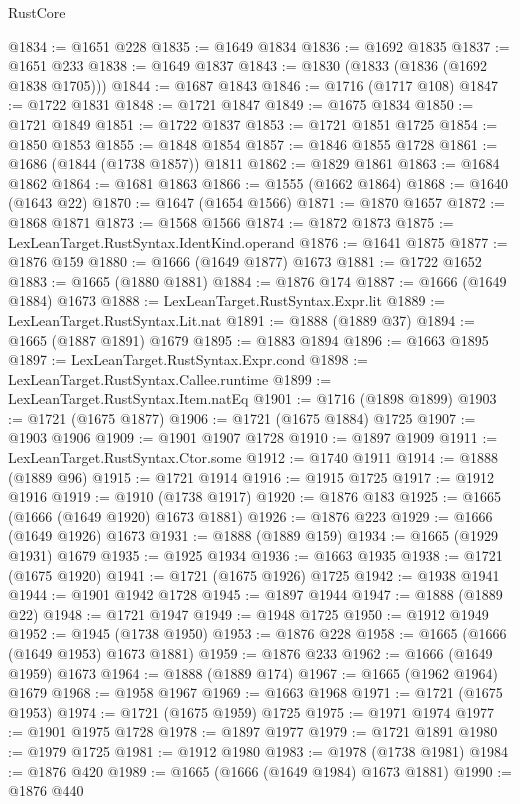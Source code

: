 \begin{lexlean}{RustCore}
\begin{coremodule}
@1834 := @1651 @228
@1835 := @1649 @1834
@1836 := @1692 @1835
@1837 := @1651 @233
@1838 := @1649 @1837
@1843 := @1830 (@1833 (@1836 (@1692 @1838 @1705)))
@1844 := @1687 @1843
@1846 := @1716 (@1717 @108)
@1847 := @1722 @1831
@1848 := @1721 @1847
@1849 := @1675 @1834
@1850 := @1721 @1849
@1851 := @1722 @1837
@1853 := @1721 @1851 @1725
@1854 := @1850 @1853
@1855 := @1848 @1854
@1857 := @1846 @1855 @1728
@1861 := @1686 (@1844 (@1738 @1857)) @1811
@1862 := @1829 @1861
@1863 := @1684 @1862
@1864 := @1681 @1863
@1866 := @1555 (@1662 @1864)
@1868 := @1640 (@1643 @22)
@1870 := @1647 (@1654 @1566)
@1871 := @1870 @1657
@1872 := @1868 @1871
@1873 := @1568 @1566
@1874 := @1872 @1873
@1875 := LexLeanTarget.RustSyntax.IdentKind.operand
@1876 := @1641 @1875
@1877 := @1876 @159
@1880 := @1666 (@1649 @1877) @1673
@1881 := @1722 @1652
@1883 := @1665 (@1880 @1881)
@1884 := @1876 @174
@1887 := @1666 (@1649 @1884) @1673
@1888 := LexLeanTarget.RustSyntax.Expr.lit
@1889 := LexLeanTarget.RustSyntax.Lit.nat
@1891 := @1888 (@1889 @37)
@1894 := @1665 (@1887 @1891) @1679
@1895 := @1883 @1894
@1896 := @1663 @1895
@1897 := LexLeanTarget.RustSyntax.Expr.cond
@1898 := LexLeanTarget.RustSyntax.Callee.runtime
@1899 := LexLeanTarget.RustSyntax.Item.natEq
@1901 := @1716 (@1898 @1899)
@1903 := @1721 (@1675 @1877)
@1906 := @1721 (@1675 @1884) @1725
@1907 := @1903 @1906
@1909 := @1901 @1907 @1728
@1910 := @1897 @1909
@1911 := LexLeanTarget.RustSyntax.Ctor.some
@1912 := @1740 @1911
@1914 := @1888 (@1889 @96)
@1915 := @1721 @1914
@1916 := @1915 @1725
@1917 := @1912 @1916
@1919 := @1910 (@1738 @1917)
@1920 := @1876 @183
@1925 := @1665 (@1666 (@1649 @1920) @1673 @1881)
@1926 := @1876 @223
@1929 := @1666 (@1649 @1926) @1673
@1931 := @1888 (@1889 @159)
@1934 := @1665 (@1929 @1931) @1679
@1935 := @1925 @1934
@1936 := @1663 @1935
@1938 := @1721 (@1675 @1920)
@1941 := @1721 (@1675 @1926) @1725
@1942 := @1938 @1941
@1944 := @1901 @1942 @1728
@1945 := @1897 @1944
@1947 := @1888 (@1889 @22)
@1948 := @1721 @1947
@1949 := @1948 @1725
@1950 := @1912 @1949
@1952 := @1945 (@1738 @1950)
@1953 := @1876 @228
@1958 := @1665 (@1666 (@1649 @1953) @1673 @1881)
@1959 := @1876 @233
@1962 := @1666 (@1649 @1959) @1673
@1964 := @1888 (@1889 @174)
@1967 := @1665 (@1962 @1964) @1679
@1968 := @1958 @1967
@1969 := @1663 @1968
@1971 := @1721 (@1675 @1953)
@1974 := @1721 (@1675 @1959) @1725
@1975 := @1971 @1974
@1977 := @1901 @1975 @1728
@1978 := @1897 @1977
@1979 := @1721 @1891
@1980 := @1979 @1725
@1981 := @1912 @1980
@1983 := @1978 (@1738 @1981)
@1984 := @1876 @420
@1989 := @1665 (@1666 (@1649 @1984) @1673 @1881)
@1990 := @1876 @440

\end{coremodule}
\end{lexlean}
